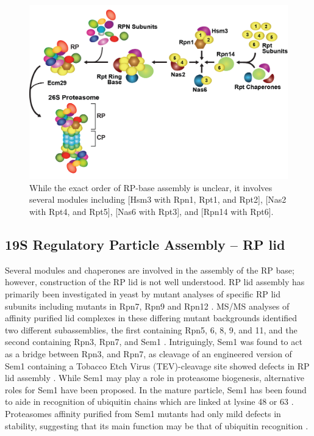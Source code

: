 \begin{figure}
	\centering
	\includegraphics[width=\columnwidth]{intro/rpassembly.png}
	{While the exact order of RP-base assembly is unclear, it involves several modules including [Hsm3 with Rpn1, Rpt1, and Rpt2], [Nas2 with Rpt4, and Rpt5], [Nas6 with Rpt3], and [Rpn14 with Rpt6].}
	\label{fig:rpassembly}
\end{figure}

\subsection{19S Regulatory Particle Assembly – RP lid}
	Several modules and chaperones are involved in the assembly of the RP base; however, construction of the RP lid is not well understood. RP lid assembly has primarily been investigated in yeast by mutant analyses of specific RP lid subunits including mutants in Rpn7, Rpn9 and Rpn12 \citep{fukunaga10}. MS/MS analyses of affinity purified lid complexes in these differing mutant backgrounds identified two different subassemblies, the first containing Rpn5, 6, 8, 9, and 11, and the second containing Rpn3, Rpn7, and Sem1 \citep{fukunaga10}. Intriguingly, Sem1 was found to act as a bridge between Rpn3, and Rpn7, as cleavage of an engineered version of Sem1 containing a Tobacco Etch Virus (TEV)-cleavage site showed defects in RP lid assembly \citep{tomko14}. While Sem1 may play a role in proteasome biogenesis, alternative roles for Sem1 have been proposed.  In the mature particle, Sem1 has been found to aide in recognition of ubiquitin chains which are linked at lysine 48 or 63 \citep{paraskevopoulos14}. Proteasomes affinity purified from Sem1 mutants had only mild defects in stability, suggesting that its main function may be that of ubiquitin recognition \citep{paraskevopoulos14}.
	
